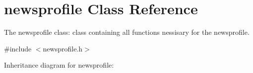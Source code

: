 \hypertarget{classnewsprofile}{}\section{newsprofile Class Reference}
\label{classnewsprofile}


The newsprofile class\+: class containing all functions nessisary for the newsprofile.  




{\ttfamily \#include $<$newsprofile.\+h$>$}



Inheritance diagram for newsprofile\+:

